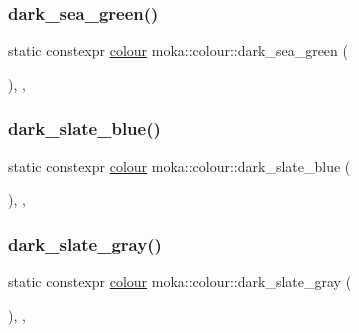 \subsubsection{\texorpdfstring{dark\_sea\_green()}{dark\_sea\_green()}}
{\footnotesize\ttfamily static constexpr \mbox{\hyperlink{classmoka_1_1colour}{colour}} moka\+::colour\+::dark\+\_\+sea\+\_\+green (\begin{DoxyParamCaption}{ }\end{DoxyParamCaption})\hspace{0.3cm}{\ttfamily [inline]}, {\ttfamily [static]}, {\ttfamily [noexcept]}}

\mbox{\label{classmoka_1_1colour_a1b85c3a0e0eb6da70cc17a82f8072e5d}} 
\subsubsection{\texorpdfstring{dark\_slate\_blue()}{dark\_slate\_blue()}}
{\footnotesize\ttfamily static constexpr \mbox{\hyperlink{classmoka_1_1colour}{colour}} moka\+::colour\+::dark\+\_\+slate\+\_\+blue (\begin{DoxyParamCaption}{ }\end{DoxyParamCaption})\hspace{0.3cm}{\ttfamily [inline]}, {\ttfamily [static]}, {\ttfamily [noexcept]}}

\mbox{\label{classmoka_1_1colour_a7570e8f845cb434a44d4101c08382248}} 
\subsubsection{\texorpdfstring{dark\_slate\_gray()}{dark\_slate\_gray()}}
{\footnotesize\ttfamily static constexpr \mbox{\hyperlink{classmoka_1_1colour}{colour}} moka\+::colour\+::dark\+\_\+slate\+\_\+gray (\begin{DoxyParamCaption}{ }\end{DoxyParamCaption})\hspace{0.3cm}{\ttfamily [inline]}, {\ttfamily [static]}, {\ttfamily [noexcept]}}

\mbox{\label{classmoka_1_1colour_a82712d48f1c5a611bffe7c0e8d2195f2}} 
